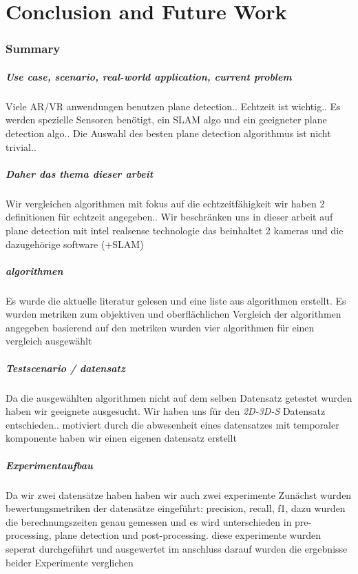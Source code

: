 \documentclass[main.tex]{subfiles}
\begin{document}
\chapter{Conclusion and Future Work}
\subsection{Summary}

\paragraph{Use case, scenario, real-world application, current problem}
Viele AR/VR anwendungen benutzen plane detection..
Echtzeit ist wichtig..
Es werden spezielle Sensoren benötigt, ein SLAM algo und ein geeigneter plane detection algo..
Die Auswahl des besten plane detection algorithmus ist nicht trivial..

\paragraph{Daher das thema dieser arbeit}
Wir vergleichen algorithmen mit fokus auf die echtzeitfähigkeit
wir haben 2 definitionen für echtzeit angegeben..
Wir beschränken uns in dieser arbeit auf plane detection mit intel realsense technologie
 das beinhaltet 2 kameras und die dazugehörige software (+SLAM)

\paragraph{algorithmen}
Es wurde die aktuelle literatur gelesen und eine liste aus algorithmen erstellt.
Es wurden metriken zum objektiven und oberflächlichen Vergleich der algorithmen angegeben
basierend auf den metriken wurden vier algorithmen für einen vergleich ausgewählt

\paragraph{Testscenario / datensatz}
Da die ausgewählten algorithmen nicht auf dem selben Datensatz getestet wurden haben wir 
geeignete ausgesucht.
Wir haben uns für den \textit{2D-3D-S} Datensatz entschieden..
motiviert durch die abwesenheit eines datensatzes mit temporaler komponente
 haben wir einen eigenen datensatz erstellt

\paragraph{Experimentaufbau}
Da wir zwei datensätze haben haben wir auch zwei experimente
Zunächst wurden bewertungsmetriken der datensätze eingeführt:
precision, recall, f1, 
dazu wurden die berechnungszeiten genau gemessen und es wird unterschieden in pre-processing,
plane detection und post-processing. 
diese experimente wurden seperat durchgeführt und ausgewertet
im anschluss darauf wurden die ergebnisse beider Experimente verglichen
\end{document}
